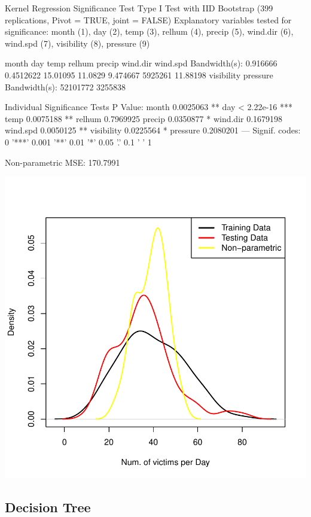 \documentclass[11pt, a4paper]{article}
\begin{document}
\begin{Schunk}
\begin{Soutput}
Kernel Regression Significance Test
Type I Test with IID Bootstrap (399 replications, Pivot = TRUE, joint = FALSE)
Explanatory variables tested for significance:
month (1), day (2), temp (3), relhum (4), precip (5), wind.dir (6), wind.spd (7), visibility (8), pressure (9)

                 month       day     temp  relhum   precip wind.dir wind.spd
Bandwidth(s): 0.916666 0.4512622 15.01095 11.0829 9.474667  5925261 11.88198
              visibility pressure
Bandwidth(s):   52101772  3255838

Individual Significance Tests
P Value: 
month      0.0025063 ** 
day        < 2.22e-16 *** 
temp       0.0075188 ** 
relhum     0.7969925  
precip     0.0350877 * 
wind.dir   0.1679198  
wind.spd   0.0050125 ** 
visibility 0.0225564 * 
pressure   0.2080201 
---
Signif. codes:  0 '***' 0.001 '**' 0.01 '*' 0.05 '.' 0.1 ' ' 1
\end{Soutput}
\begin{Soutput}
Non-parametric MSE: 170.7991
\end{Soutput}
\end{Schunk}
\includegraphics{regression-035}


\pagebreak
\subsection{Decision Tree}
\end{document}
